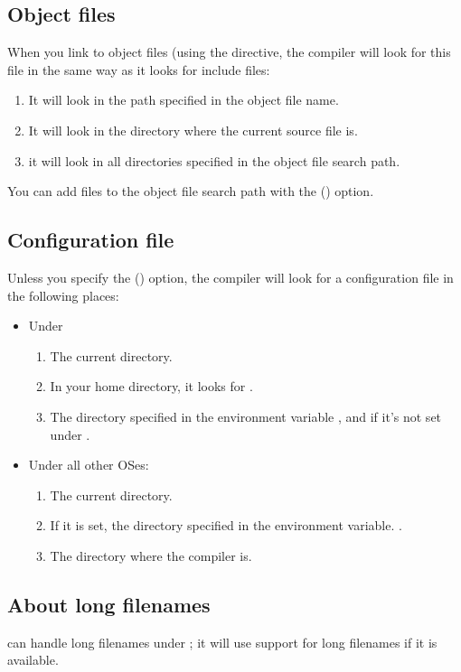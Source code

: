 \documentclass{report}
\begin{document}
\subsection{Object files}
When you link to object files (using the  directive,
the compiler will look for this file in the same way as it looks for include
files:

\begin{enumerate}
\item It will look in the path specified in the object file name.
\item It will look in the directory where the current source file is.
\item it will look in all directories specified in the object file search path.
\end{enumerate}
You can add files to the object file search path with the  ()
option.

\subsection{Configuration file}
\label{searchconfig}
Unless you specify the  () option, the compiler will look
for a configuration file  in the following places:

\begin{itemize}
\item Under \linux
\begin{enumerate}
\item The current directory.
\item In your home directory, it looks for .
\item The directory specified in the environment variable
, and if it's not set under .
\end{enumerate}
\item Under all other OSes:
\begin{enumerate}
\item The current directory.
\item If it is set, the directory specified in the environment variable.
.
\item The directory where the compiler is.
\end{enumerate}
\end{itemize}

\subsection{About long filenames}
\fpc can handle long filenames under \windows; it will use support for
long filenames if it is available.
\end{document}

